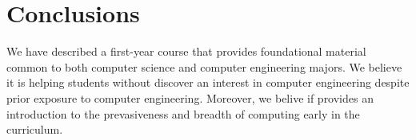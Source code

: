 \section{Conclusions}
\label{sec:conclude}


We have described a first-year course that provides foundational material common to  both computer science and computer engineering majors. We believe it is helping students without discover an interest in computer engineering despite prior exposure to computer engineering.  Moreover, we belive if provides an introduction to the prevasiveness and breadth of computing early in the curriculum.

